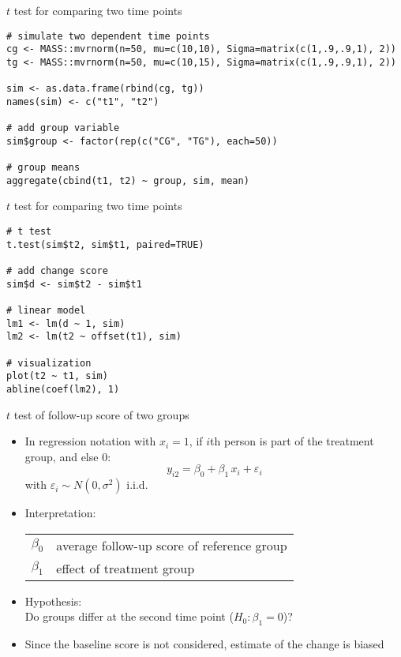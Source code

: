 \documentclass[aspectratio=169]{beamer}
\begin{document}
{

\begin{frame}[fragile]{$t$ test for comparing two time points}
\begin{lstlisting}
# simulate two dependent time points
cg <- MASS::mvrnorm(n=50, mu=c(10,10), Sigma=matrix(c(1,.9,.9,1), 2))
tg <- MASS::mvrnorm(n=50, mu=c(10,15), Sigma=matrix(c(1,.9,.9,1), 2))

sim <- as.data.frame(rbind(cg, tg))
names(sim) <- c("t1", "t2")

# add group variable
sim$group <- factor(rep(c("CG", "TG"), each=50))

# group means
aggregate(cbind(t1, t2) ~ group, sim, mean)
\end{lstlisting}
\end{frame}

\begin{frame}[fragile]{$t$ test for comparing two time points}
\begin{lstlisting}
# t test
t.test(sim$t2, sim$t1, paired=TRUE)

# add change score
sim$d <- sim$t2 - sim$t1

# linear model
lm1 <- lm(d ~ 1, sim)
lm2 <- lm(t2 ~ offset(t1), sim)

# visualization
plot(t2 ~ t1, sim)
abline(coef(lm2), 1)
\end{lstlisting}
\end{frame}

}


\begin{frame}{$t$ test of follow-up score of two groups}
\begin{itemize}
  \item In regression notation with $x_i = 1$, if $i$th person is part of
    the treatment group, and else $0$:
    \[
      y_{i2} = \beta_0 + \beta_1 \, x_i + \varepsilon_i
    \]
    with $\varepsilon_i \sim N(0, \sigma^2)$ i.i.d.
  \item Interpretation:
    \begin{center}
    \begin{tabular}{ll}
    $\beta_0$ & average follow-up score of reference group\\
    $\beta_1$ & effect of treatment group
    \end{tabular}
    \end{center}
  \item Hypothesis:\\
        Do groups differ at the second time point ($H_0\colon \beta_1 = 0$)?
  \item Since the baseline score is not considered, estimate of the change
    is biased
\end{itemize}
\end{frame}
\end{document}
